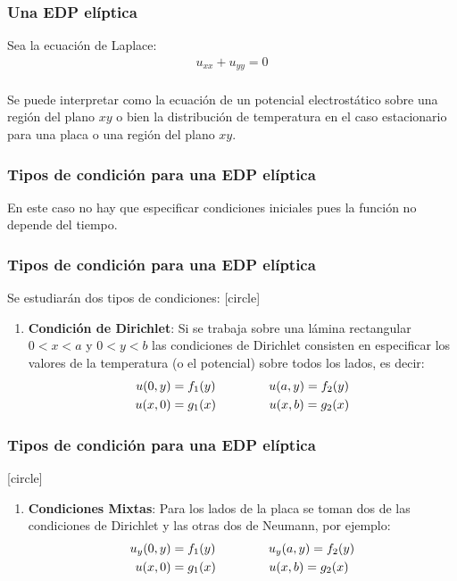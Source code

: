 \documentclass[12pt]{beamer}
\begin{document}
\begin{frame}
\frametitle{Una EDP elíptica}
Sea la ecuación de Laplace:
\begin{align*}
u_{xx} + u_{yy} = 0
\end{align*}
\\
\bigskip
\pause
Se puede interpretar como la ecuación de un potencial electrostático sobre una región del plano $xy$ o bien la distribución de temperatura en el caso estacionario para una placa o una región del plano $xy$.
\end{frame}
\begin{frame}
\frametitle{Tipos de condición para una EDP elíptica}
En este caso no hay que especificar condiciones iniciales pues la función no depende del tiempo.
\\
\bigskip
\pause
\end{frame}
\begin{frame}
\frametitle{Tipos de condición para una EDP elíptica}
Se estudiarán dos tipos de condiciones:
[circle]
\begin{enumerate}[<+->]
\item \textbf{Condición de Dirichlet}: Si se trabaja sobre una lámina rectangular $0 < x < a$ y $0 < y < b$ las condiciones de Dirichlet consisten en especificar los valores de la temperatura (o el potencial) sobre todos los lados, es decir:
\begin{align}
\begin{aligned}
u(0, y) &= f_{1}(y) \hspace{1.5cm} u(a, y) = f_{2}(y) \\
u(x, 0) &= g_{1}(x) \hspace{1.5cm} u(x, b) = g_{2}(x)
\end{aligned}
\label{eq:ecuacion_06_02_05}
\end{align}
\seti
\end{enumerate}
\end{frame}
\begin{frame}
\frametitle{Tipos de condición para una EDP elíptica}
[circle]
\begin{enumerate}[<+->]
\conti
\item \textbf{Condiciones Mixtas}: Para los lados de la placa se toman dos de las condiciones de Dirichlet y las otras dos de Neumann, por ejemplo:
\begin{align}
\begin{aligned}
u_{y}(0, y) &= f_{1}(y) \hspace{1.5cm} u_{y}(a, y) = f_{2}(y) \\
u(x, 0) &= g_{1}(x) \hspace{1.5cm} u(x, b) = g_{2}(x)
\end{aligned}
\label{eq:ecuacion_06_01_06}
\end{align}
\end{enumerate}
\end{frame}
\end{document}
